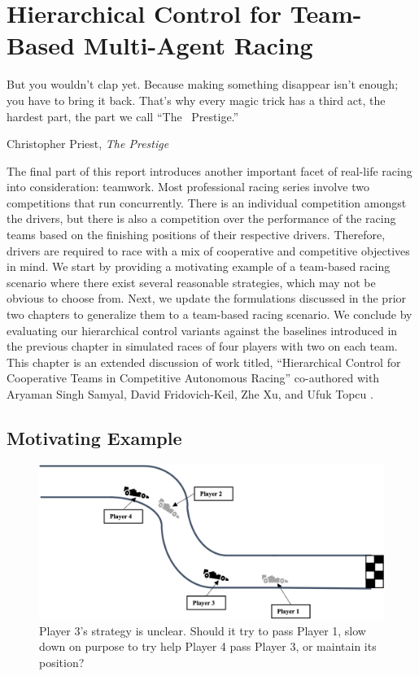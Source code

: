 \chapter{Hierarchical Control for Team-Based Multi-Agent Racing}
\epigraph{\flushright But you wouldn't clap yet. Because making something disappear isn't enough; you have to bring it back. That's why every magic trick has a third act, the hardest part, the part we call ``The~ Prestige.''}{Christopher Priest, \textit{The Prestige}}
\label{chapter:team}
The final part of this report introduces another important facet of real-life racing into consideration: teamwork. Most professional racing series involve two competitions that run concurrently. There is an individual competition amongst the drivers, but there is also a competition over the performance of the racing teams based on the finishing positions of their respective drivers. Therefore, drivers are required to race with a mix of cooperative and competitive objectives in mind. We start by providing a motivating example of a team-based racing scenario where there exist several reasonable strategies, which may not be obvious to choose from. Next, we update the formulations discussed in the prior two chapters to generalize them to a team-based racing scenario. We conclude by evaluating our hierarchical control variants against the baselines introduced in the previous chapter in simulated races of four players with two on each team. This chapter is an extended discussion of work titled, ``Hierarchical Control for Cooperative Teams in Competitive Autonomous Racing'' co-authored with Aryaman Singh Samyal, David Fridovich-Keil, Zhe Xu, and Ufuk Topcu \cite{thakkarprior2}.

\section{Motivating Example}
\begin{figure}
  \centering
  \includegraphics[width=\textwidth]{Figures/TeamMotiv.png}
  \caption[Motivating example for team-based racing] {Player 3's strategy is unclear. Should it try to pass Player 1, slow down on purpose to try help Player 4 pass Player 3, or maintain its position?}
  \label{fig:team_motivating}
\end{figure}

